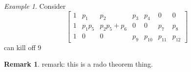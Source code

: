 \documentclass[11pt]{article}
\theoremstyle{remark}
\newtheorem{eg}[thm]{Example}
\theoremstyle{definition}
\newtheorem{rmk}[thm]{Remark}
\begin{document}
\begin{appendices}
\begin{eg}
Consider
\begin{displaymath}
\begin{bmatrix}
1 & p_1 & p_2 & p_3 & p_4 & 0 & 0 \\
1 & p_1 p_5 & p_2 p_5 + p_6 & 0 & 0 & p_7 & p_8 \\
1 & 0 & 0 & p_9 & p_{10} & p_{11} & p_{12}
\end{bmatrix}
\end{displaymath}
can kill off 9
\end{eg}

\begin{rmk}
remark: this is a rado theorem thing.
\end{rmk}

\end{appendices}
\end{document}

